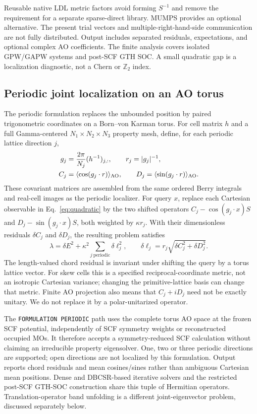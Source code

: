 Reusable native LDL metric factors avoid forming $S^{-1}$ and remove
the requirement for a separate sparse-direct library. MUMPS provides
an optional alternative. The present
trial vectors and multiple-right-hand-side communication are not
fully distributed. Output includes separated residuals,
expectations, and optional complex AO coefficients.
The finite analysis covers isolated GPW/GAPW systems and post-SCF
GTH SOC. A small quadratic gap is a localization diagnostic,
not a Chern or $\mathbb Z_2$ index.

\subsection{Periodic joint localization on an AO torus}
The periodic formulation replaces the unbounded position by paired
trigonometric coordinates on a Born--von Karman torus. For cell
matrix $h$ and a full Gamma-centered $N_1\times N_2\times N_3$
property mesh, define, for each periodic lattice direction $j$,
\begin{equation}
 \begin{split}
 g_j&=\frac{2\pi}{N_j}(h^{-1})_{j,:},\qquad r_j=|g_j|^{-1},\\
 C_j&=\langle\cos(g_j\cdot r)\rangle_{\rm AO},\qquad
 D_j=\langle\sin(g_j\cdot r)\rangle_{\rm AO}.
 \end{split}
 \label{eq:quadratic-torus}
\end{equation}
These covariant matrices are assembled from the same ordered
Berry integrals and real-cell images as the periodic localizer.
For query $x$, replace each Cartesian observable in
Eq.~\eqref{eq:quadratic} by the two shifted operators
$C_j-\cos(g_j\cdot x)S$ and $D_j-\sin(g_j\cdot x)S$, both
weighted by $\kappa r_j$. With their dimensionless residuals
$\delta C_j$ and $\delta D_j$, the resulting problem satisfies
\begin{equation}
 \lambda=\delta E^2+\kappa^2\sum_{j\ \mathrm{periodic}}
 \delta\ell_j^2,\qquad
 \delta\ell_j=r_j\sqrt{\delta C_j^2+\delta D_j^2}.
 \label{eq:quadratic-chord}
\end{equation}
The length-valued chord residual is invariant under shifting the
query by a torus lattice vector. For skew cells this is a specified
reciprocal-coordinate metric, not an isotropic Cartesian variance;
changing the primitive-lattice basis can change that metric.
Finite AO projection also means that $C_j+iD_j$ need not be exactly
unitary. We do not replace it by a polar-unitarized operator.

The \texttt{FORMULATION PERIODIC} path uses the complete torus AO
space at the frozen SCF potential, independently of SCF symmetry
weights or reconstructed occupied MOs. It therefore accepts a
symmetry-reduced SCF calculation without claiming an irreducible
property eigensolver. One, two or three periodic directions are
supported; open directions are not localized by this formulation.
Output reports chord residuals and mean cosines/sines rather than
ambiguous Cartesian mean positions. Dense and DBCSR-based iterative solvers
and the restricted post-SCF GTH-SOC construction share this tuple
of Hermitian operators. Translation-operator band unfolding is a
different joint-eigenvector problem, discussed separately below.

